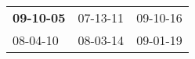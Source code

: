 \begin{supertabular}{p{0.33\columnwidth}p{0.33\columnwidth}p{0.33\columnwidth}}
 \textbf{09-10-05\textsuperscript{}} &  07-13-11\textsuperscript{} &  09-10-16\textsuperscript{} \\
          08-04-10\textsuperscript{} &  08-03-14\textsuperscript{} &  09-01-19\textsuperscript{} \\
\end{supertabular}
